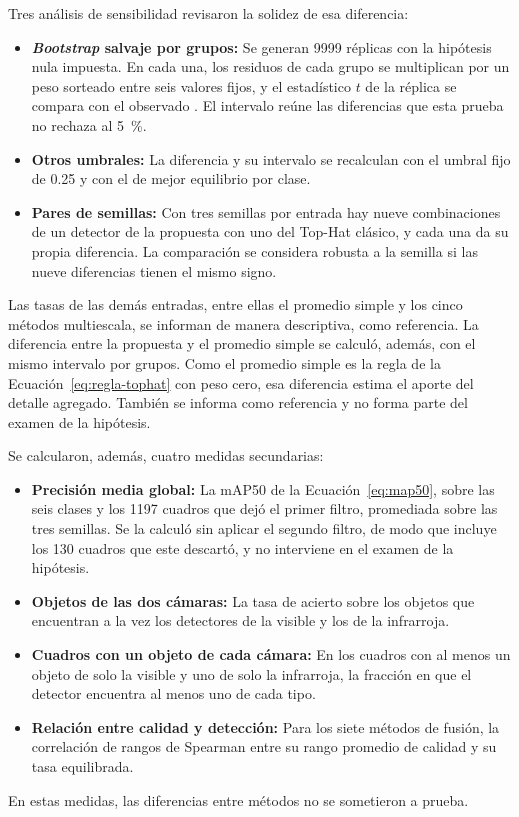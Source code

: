 Tres análisis de sensibilidad revisaron la solidez de esa diferencia:
\begin{itemize}
\item \textbf{\textit{Bootstrap} salvaje por grupos:} Se generan 9999 réplicas con la hipótesis nula
impuesta. En cada una, los residuos de cada grupo se multiplican por un peso sorteado entre seis valores
fijos, y el estadístico $t$ de la réplica se compara con el observado \parencite{cameron2008, webb2023}.
El intervalo reúne las diferencias que esta prueba no rechaza al 5~\%.
\item \textbf{Otros umbrales:} La diferencia y su intervalo se recalculan con el umbral fijo de 0.25 y
con el de mejor equilibrio por clase.
\item \textbf{Pares de semillas:} Con tres semillas por entrada hay nueve combinaciones de un detector
de la propuesta con uno del Top-Hat clásico, y cada una da su propia diferencia. La comparación se
considera robusta a la semilla si las nueve diferencias tienen el mismo signo.
\end{itemize}
Las tasas de las demás entradas, entre ellas el promedio simple y los cinco métodos multiescala, se
informan de manera descriptiva, como referencia. La diferencia entre la propuesta y el promedio simple
se calculó, además, con el mismo intervalo por grupos. Como el promedio simple es la regla de la
Ecuación~\eqref{eq:regla-tophat} con peso cero, esa diferencia estima el aporte del detalle agregado.
También se informa como referencia y no forma parte del examen de la hipótesis.

Se calcularon, además, cuatro medidas secundarias:
\begin{itemize}
\item \textbf{Precisión media global:} La mAP50 de la Ecuación~\eqref{eq:map50}, sobre las seis clases
y los 1197 cuadros que dejó el primer filtro, promediada sobre las tres semillas. Se la calculó sin
aplicar el segundo filtro, de modo que incluye los 130 cuadros que este descartó, y no interviene en el
examen de la hipótesis.
\item \textbf{Objetos de las dos cámaras:} La tasa de acierto sobre los objetos que encuentran a la vez
los detectores de la visible y los de la infrarroja.
\item \textbf{Cuadros con un objeto de cada cámara:} En los cuadros con al menos un objeto de solo la
visible y uno de solo la infrarroja, la fracción en que el detector encuentra al menos uno de cada tipo.
\item \textbf{Relación entre calidad y detección:} Para los siete métodos de fusión, la correlación de
rangos de Spearman \parencite{spearman1904} entre su rango promedio de calidad y su tasa equilibrada.
\end{itemize}
En estas medidas, las diferencias entre métodos no se sometieron a prueba.


